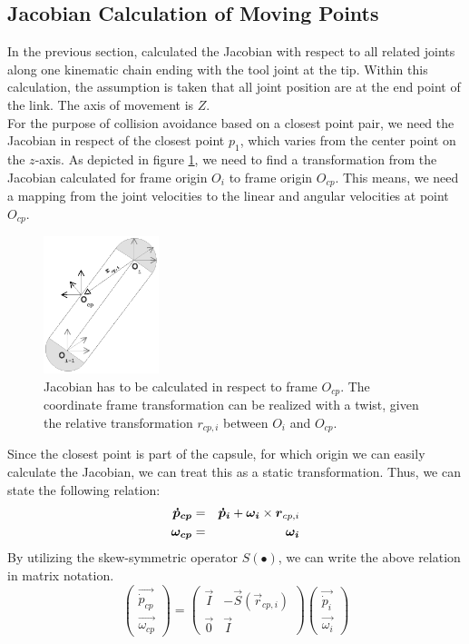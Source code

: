 \subsection{Jacobian Calculation of Moving Points}
In the previous section, calculated the Jacobian with respect to all related joints along one kinematic chain ending with the tool joint at the tip. Within this calculation, the assumption is taken that all joint position are at the end point of the link. The axis of movement is $Z$. \\
For the purpose of collision avoidance based on a closest point pair, we need the Jacobian in respect of the closest point $p_1$, which varies from the center point on the $z$-axis. As depicted in figure \ref{fig:capsulejacobian}, we need to find a transformation from the Jacobian calculated for frame origin $O_i$ to frame origin $O_{cp}$. This means, we need a mapping from the joint velocities to the linear and angular velocities at point $O_{cp}$. 
\begin{figure}[h!]
  \centering
    \includegraphics[width=0.3\textwidth]{../figures/capsulejacobian.eps}
    \caption{Jacobian has to be calculated in respect to frame $O_{cp}$. The coordinate frame transformation can be realized with a twist, given the relative transformation $r_{cp,i}$ between $O_i$ and $O_{cp}$. }
    \label{fig:capsulejacobian}
\end{figure}
Since the closest point is part of the capsule, for which origin we can easily calculate the Jacobian, we can treat this as a static transformation. Thus, we can state the following relation:
\begin{eqnarray}
\vec{\dot{p}_{cp}} &=& \vec{\dot{p}_i} + \vec{\omega_i} \times \vec{r}_{cp,i}  \notag \\
\vec{\omega_{cp}} &=& \vec{\omega_i}
\end{eqnarray}
By utilizing the skew-symmetric operator $S(\bullet)$, we can write the above relation in matrix notation. 
\begin{equation}
\begin{pmatrix}
\vec{\dot{p}_{cp}} \\
\vec{\omega_{cp}}
\end{pmatrix}  = 
\begin{pmatrix}
\vec{I} & -\vec{S}(\vec{r}_{cp,i}) \\
\vec{0} & \vec{I}
\end{pmatrix} 
\begin{pmatrix}
\vec{\dot{p}_{i}} \\
\vec{\omega_{i}}
\end{pmatrix} \label{eqn:twist}
\end{equation} 

